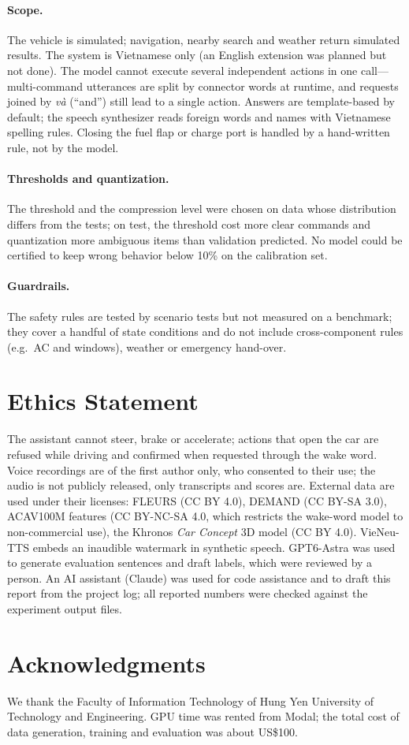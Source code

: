 \paragraph{Scope.} The vehicle is simulated; navigation, nearby search and weather return simulated results. The system is
Vietnamese only (an English extension was planned but not done). The model cannot execute several independent actions in one
call---multi-command utterances are split by connector words at runtime, and requests joined by \textit{và} (``and'') still
lead to a single action. Answers are template-based by default; the speech synthesizer reads foreign words and names with
Vietnamese spelling rules. Closing the fuel flap or charge port is handled by a hand-written rule, not by the model.

\paragraph{Thresholds and quantization.} The threshold and the compression level were chosen on data whose distribution
differs from the tests; on test, the threshold cost more clear commands and quantization more ambiguous items than validation
predicted. No model could be certified to keep wrong behavior below 10\% on the calibration set.

\paragraph{Guardrails.} The safety rules are tested by scenario tests but not measured on a benchmark; they cover a handful of
state conditions and do not include cross-component rules (e.g.\ AC and windows), weather or emergency hand-over.

\section*{Ethics Statement}

The assistant cannot steer, brake or accelerate; actions that open the car are refused while driving and confirmed when
requested through the wake word. Voice recordings are of the first author only, who consented to their use; the audio is not publicly released, only
transcripts and scores are. External data are
used under their licenses: FLEURS (CC BY 4.0), DEMAND (CC BY-SA 3.0), ACAV100M features (CC BY-NC-SA 4.0, which restricts the wake-word model
to non-commercial use), the Khronos \emph{Car Concept} 3D model (CC BY 4.0). VieNeu-TTS embeds an inaudible watermark in synthetic
speech. GPT6-Astra was used to generate evaluation sentences and draft labels, which were reviewed by a person. An AI assistant
(Claude) was used for code assistance and to draft this report from the project log; all reported numbers were checked against
the experiment output files.

\section*{Acknowledgments}

We thank the Faculty of Information Technology of Hung Yen University of Technology and Engineering. GPU time was rented from
Modal; the total cost of data generation, training and evaluation was about US\$100.
